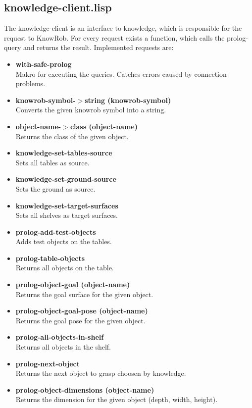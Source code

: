 \documentclass[main.tex]{subfiles}
\begin{document}
		\subsection{knowledge-client.lisp}
		The knowledge-client is an interface to knowledge, which is responsible for the request to KnowRob. For every request exists a function, which calls the prolog-query and returns the result. Implemented requests are:
			\begin{itemize}
			  \item \textbf{with-safe-prolog} \\
			  Makro for executing the queries. Catches errors caused by connection problems.
			  \item \textbf{knowrob-symbol-$>$string (knowrob-symbol)} \\
			  Converts the given knowrob symbol into a string.
			  \item \textbf{object-name-$>$class (object-name)} \\
			  Returns the class of the given object.
				\item \textbf{knowledge-set-tables-source} \\ Sets all tables as source.
				\item \textbf{knowledge-set-ground-source} \\ Sets the ground as source.
				\item \textbf{knowledge-set-target-surfaces} \\ Sets all shelves as target surfaces.
			  \item \textbf{prolog-add-test-objects} \\ Adds test objects on the tables.
				\item \textbf{prolog-table-objects} \\ Returns all objects on the table.
				\item \textbf{prolog-object-goal (object-name)} \\ Returns the goal surface for the given object.
			  \item \textbf{prolog-object-goal-pose (object-name)} \\ Returns the goal pose for the given object.
				\item \textbf{prolog-all-objects-in-shelf} \\ Returns all objects in the shelf.
				\item \textbf{prolog-next-object} \\ Returns the next object to grasp choosen by knowledge.
		    \item \textbf{prolog-object-dimensions (object-name)} \\ Returns the dimension for the given object (depth, width, height).

\end{itemize}
\end{document}
